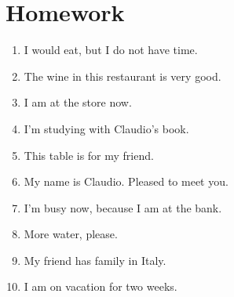 \section{Homework}
\begin{enumerate}
    \item I would eat, but I do not have time. \\
    \item The wine in this restaurant is very good. \\
    \item I am at the store now. \\
    \item I'm studying with Claudio's book. \\
    \item This table is for my friend. \\
    \item My name is Claudio. Pleased to meet you. \\
    \item I'm busy now, because I am at the bank. \\
    \item More water, please. \\
    \item My friend has family in Italy. \\
    \item I am on vacation for two weeks. \\
\end{enumerate}
